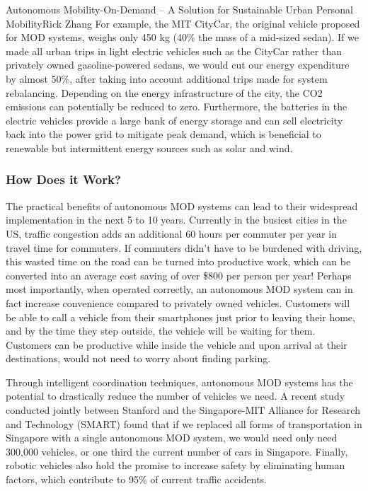 \documentclass{papertex}
\begin{document}
\begin{news}{2}{Autonomous Mobility-On-Demand -- A Solution for Sustainable Urban Personal Mobility}{Rick Zhang}{}{}
For example, the MIT CityCar, the original vehicle proposed for MOD systems, 
weighs only 450 kg (40\% the mass of a mid-sized sedan). If we made all urban 
trips in light electric vehicles such as the CityCar rather than privately 
owned gasoline-powered sedans, we would cut our energy expenditure by almost 
50\%, after taking into account additional trips made for system rebalancing. 
Depending on the energy infrastructure of the city, the CO2 emissions can 
potentially be reduced to zero. Furthermore, the batteries in the electric 
vehicles provide a large bank of energy storage and can sell electricity back 
into the power grid to mitigate peak demand, which is beneficial to renewable 
but intermittent energy sources such as solar and wind.

\subsubsection*{\textbf{How Does it Work?}}

The practical benefits of autonomous MOD systems can lead to their widespread 
implementation in the next 5 to 10 years. Currently in the busiest cities in 
the US, traffic congestion adds an additional 60 hours per commuter per year 
in travel time for commuters. If commuters didn’t have to be burdened with 
driving, this wasted time on the road can be turned into productive work, 
which can be converted into an average cost saving of over \$800 per person 
per year! Perhaps most importantly, when operated correctly, an autonomous 
MOD system can in fact increase convenience compared to privately owned 
vehicles. Customers will be able to call a vehicle from their smartphones 
just prior to leaving their home, and by the time they step outside, the 
vehicle will be waiting for them. Customers can be productive while inside 
the vehicle and upon arrival at their destinations, would not need to worry 
about finding parking.

Through intelligent coordination techniques, autonomous MOD systems has the 
potential to drastically reduce the number of vehicles we need. A recent study 
conducted jointly between Stanford and the Singapore-MIT Alliance for Research 
and Technology (SMART) found that if we replaced all forms of transportation 
in Singapore with a single autonomous MOD system, we would need only need 
300,000 vehicles, or one third the current number of cars in Singapore. 
Finally, robotic vehicles also hold the promise to increase safety by 
eliminating human factors, which contribute to 95\% of current traffic 
accidents.


\end{news}
\end{document}

